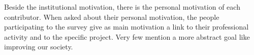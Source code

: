 \documentclass[letterpaper, 10 pt, conference]{ieeeconf}  %
\begin{document}
Beside the institutional motivation, there is the personal motivation of each contributor.
When asked about their personal motivation, the people participating to the survey give as main motivation a link to their professional activity and to the specific project.
Very few mention a more abstract goal like improving our society.

\end{document}

